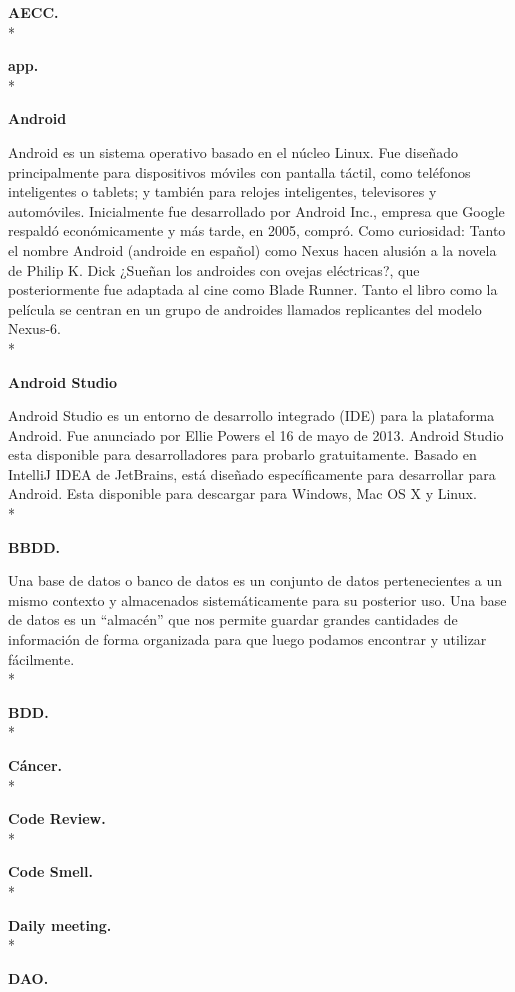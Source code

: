 \documentclass[../pfc.tex]{subfiles}
\begin{document}
	
	\textbf{AECC.}\\*
		
	\textbf{app.}\\*
		
	\textbf{Android}
	
	Android es un sistema operativo basado en el núcleo Linux. Fue diseñado principalmente para dispositivos móviles con pantalla táctil, como teléfonos inteligentes o tablets; y también para relojes inteligentes, televisores y automóviles. Inicialmente fue desarrollado por Android Inc., empresa que Google respaldó económicamente y más tarde, en 2005, compró. Como curiosidad: Tanto el nombre Android (androide en español) como Nexus hacen alusión a la novela de Philip K. Dick ¿Sueñan los androides con ovejas eléctricas?, que posteriormente fue adaptada al cine como Blade Runner. Tanto el libro como la película se centran en un grupo de androides llamados replicantes del modelo Nexus-6.\\*
	
	\textbf{Android Studio}
	
	Android Studio es un entorno de desarrollo integrado (IDE) para la plataforma Android. Fue anunciado por Ellie Powers el 16 de mayo de 2013. Android Studio esta disponible para desarrolladores para probarlo gratuitamente. Basado en IntelliJ IDEA de JetBrains, está diseñado específicamente para desarrollar para Android. Esta disponible para descargar para Windows, Mac OS X y Linux.\\*
	
	\textbf{BBDD.}
	
	Una base de datos o banco de datos es un conjunto de datos pertenecientes a un mismo
	contexto y almacenados sistemáticamente para su posterior uso. Una base de datos es un “almacén”
	que nos permite guardar grandes cantidades de información de forma organizada para que luego
	podamos encontrar y utilizar fácilmente.\\*
	
	\textbf{BDD.}\\*
	
	\textbf{Cáncer.}	\\*
	
	\textbf{Code Review.}\\*
	
	\textbf{Code Smell.}\\*
	
	\textbf{Daily meeting.}\\*
	
	\textbf{DAO.}
	
\end{document}

